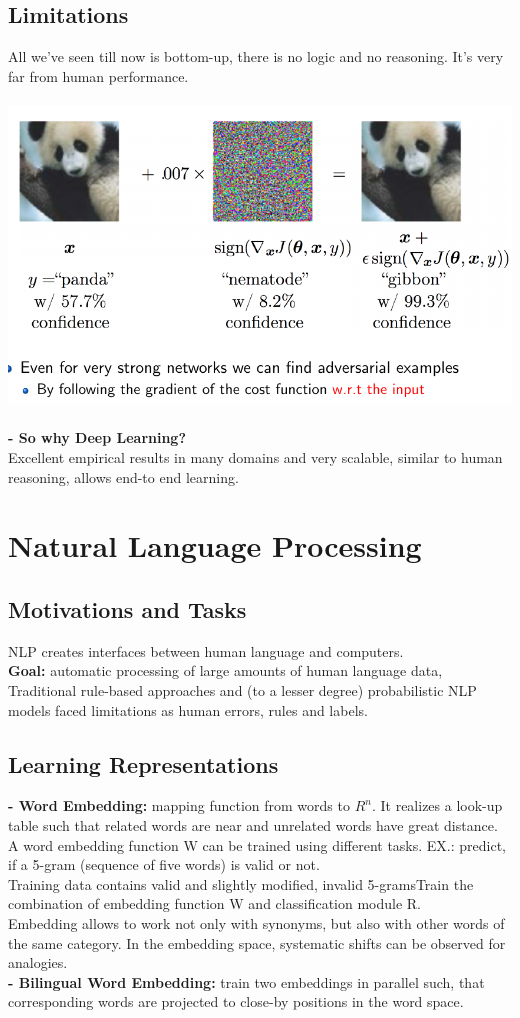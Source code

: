 \documentclass{article}
\begin{document}
\subsection{Limitations}
All we've seen till now is bottom-up, there is no logic and no reasoning. It's very far from human performance.\\\\
\includegraphics[scale=0.3]{97.png}\\\\
\textbf{- So why Deep Learning?}\\
Excellent empirical results in many domains and very scalable, similar to human reasoning, allows end-to end learning.

\section{Natural Language Processing}
\subsection{Motivations and Tasks}
NLP creates interfaces between human language and computers.\\
\textbf{Goal:} automatic processing of large amounts of human language data,\\
Traditional rule-based approaches and (to a lesser degree) probabilistic NLP models faced limitations as human errors, rules and labels.
\subsection{Learning Representations}
\textbf{- Word Embedding: }mapping function from words to $R^n$. It realizes a look-up table such that related words are near and unrelated words have great distance.\\
A word embedding function W can be trained using different tasks. EX.: predict, if a 5-gram (sequence of five words) is valid or not.\\
Training data contains valid and slightly modified, invalid 5-gramsTrain the combination of embedding function W and classification module R.\\
Embedding allows to work not only with synonyms, but also with other words of the same category. In the embedding space, systematic shifts can be observed for analogies.\\
\textbf{- Bilingual Word Embedding: } train two embeddings in parallel such, that corresponding words are projected to close-by positions in the word space.
\end{document}

